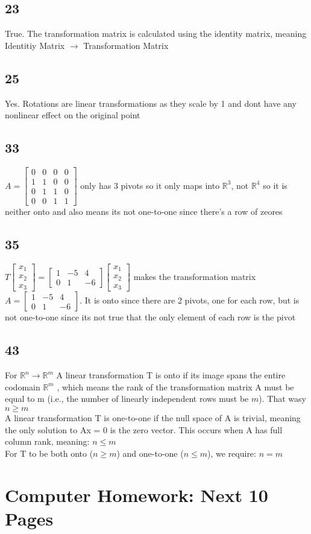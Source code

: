 \documentclass{article}
\begin{document}
\subsection*{23}
True. The transformation matrix is calculated using the identity matrix, meaning\\Identitiy Matrix $\rightarrow$ Transformation Matrix
\subsection*{25}
Yes. Rotations are linear transformations as they scale by 1 and dont have any nonlinear effect on the original point
\subsection*{33}
$
A = \begin{bmatrix}
0 & 0 & 0 & 0 \\
1 & 1 & 0 & 0 \\
0 & 1 & 1 & 0 \\
0 & 0 & 1 & 1
\end{bmatrix}
$ only has 3 pivots so it only maps into $\mathbb{R}^3$, not $\mathbb{R}^4$ so it is neither onto and also means its not one-to-one since there's a row of zeores
\subsection*{35}
$
T \begin{bmatrix} x_1 \\ x_2 \\ x_3 \end{bmatrix} =
\begin{bmatrix}
1 & -5 & 4 \\
0 & 1 & -6
\end{bmatrix}
\begin{bmatrix} x_1 \\ x_2 \\ x_3 \end{bmatrix}
$ makes the transformation matrix $
A = \begin{bmatrix}
1 & -5 & 4 \\
0 & 1 & -6
\end{bmatrix}
$. It is onto since there are 2 pivots, one for each row, but is not one-to-one since its not true that the only element of each row is the pivot
\subsection*{43}
For $\mathbb{R}^n \rightarrow \mathbb{R}^m$ A linear transformation  T  is onto if its image spans the entire codomain  $\mathbb{R}^m$ , which means the rank of the transformation matrix  A  must be equal to  m  (i.e., the number of linearly independent rows must be  $m$). That wasy $n\geq m$
\\A linear transformation  T  is one-to-one if the null space of  A  is trivial, meaning the only solution to  Ax = 0  is the zero vector. This occurs when  A  has full column rank, meaning: $n \leq m$
\\ For  T  to be both onto ($ n \geq m $) and one-to-one ($ n \leq m $), we require: $n = m$

\pagebreak \section*{Computer Homework: Next 10 Pages}
\end{document}
